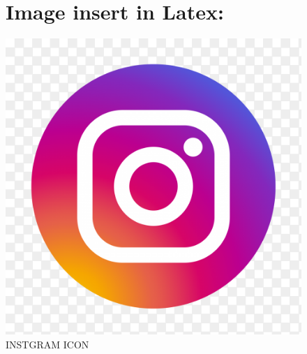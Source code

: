\documentclass[a4paper,12pt,oneside,article]{article}
\begin{document}
\newpage
\vspace{1cm}
\begin{figure}
\section{Image insert in Latex: }
    \centering
   
    \includegraphics{instapic.png}
    \caption{INSTGRAM ICON}
    \label{fig:my_label}
\end{figure}
\end{document}
